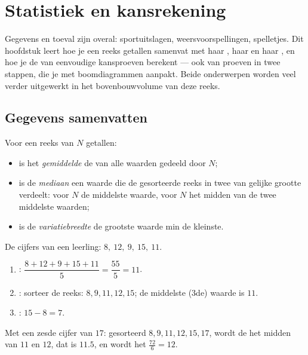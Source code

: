\chapter{Statistiek en kansrekening}\label{ch:g9:statproba}

Gegevens en toeval zijn overal: sportuitslagen, weersvoorspellingen, spelletjes.
Dit hoofdstuk leert hoe je een reeks getallen samenvat met haar , haar
 en haar , en hoe je de  van eenvoudige kansproeven
berekent --- ook van proeven in twee stappen, die je met boomdiagrammen aanpakt.
Beide onderwerpen worden veel verder uitgewerkt in het bovenbouwvolume van deze
reeks.

\section{Gegevens samenvatten}

\begin{definition}\label{def:g9:statproba:indicators}
Voor een reeks van $N$ getallen:
\begin{itemize}
  \item is het \emph{gemiddelde} de  van alle waarden gedeeld
        door $N$;
  \item is de \emph{mediaan} een waarde die de gesorteerde reeks in
        twee  van gelijke grootte verdeelt: voor  $N$ de middelste
        waarde, voor  $N$ het midden van de twee middelste waarden;
  \item is de \emph{variatiebreedte} de grootste waarde min
        de kleinste.
\end{itemize}
\end{definition}

\begin{example}\label{ex:g9:statproba:indicators}
De cijfers van een leerling: $8,\ 12,\ 9,\ 15,\ 11$.
\begin{enumerate}
  \item {}: $\dfrac{8 + 12 + 9 + 15 + 11}{5} = \dfrac{55}{5} = 11$.
  \item {}: sorteer de reeks: $8, 9, 11, 12, 15$; de middelste (3de) waarde is
        $11$.
  \item {}: $15 - 8 = 7$.
\end{enumerate}
Met een zesde cijfer van $17$: gesorteerd $8, 9, 11, 12, 15, 17$, wordt de 
het midden van $11$ en $12$, dat is $11.5$, en wordt het 
$\frac{72}{6} = 12$.
\end{example}

